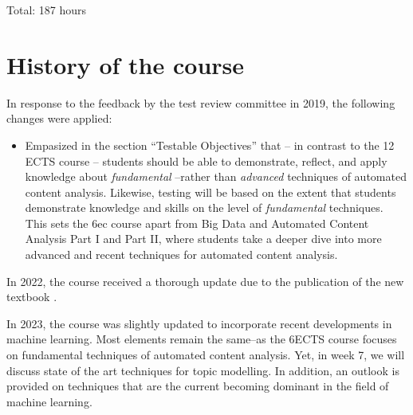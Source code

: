 \documentclass[a4paper,12pt]{report}
\begin{document}
Total: 187 hours


\chapter{History of the course}
In response to the feedback by the test review committee in 2019, the following changes were applied:
\begin{itemize}
\item Empasized in the section ``Testable Objectives'' that -- in contrast to the 12 ECTS course -- students should be able to demonstrate, reflect, and apply knowledge about \emph{fundamental} --rather than \emph{advanced} techniques of automated content analysis. Likewise, testing will be based on the extent that students demonstrate knowledge and skills on the level of \emph{fundamental} techniques. This sets the 6ec course apart from Big Data and Automated Content Analysis Part I and Part II, where students take a deeper dive into more advanced and recent techniques for automated content analysis.
\end{itemize}

In 2022, the course received a thorough update due to the publication of the new textbook \citep{cssbook}.

In 2023, the course was slightly updated to incorporate recent developments in machine learning. Most elements remain the same--as the 6ECTS course focuses on fundamental techniques of automated content analysis. Yet, in week 7, we will discuss state of the art techniques for topic modelling. In addition, an outlook is provided on techniques that are the current becoming dominant in the field of machine learning. 




 
 
 
\end{document}
